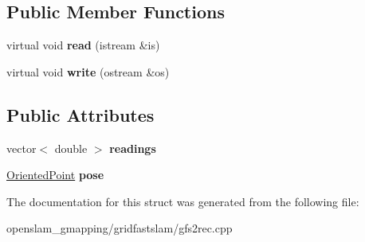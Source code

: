 \subsection*{Public Member Functions}
\begin{DoxyCompactItemize}
\item 
\mbox{\label{structLaserRecord_ab5b904cd01d1d4762af5dee413091611}} 
virtual void {\bfseries read} (istream \&is)
\item 
\mbox{\label{structLaserRecord_aae737a162d4637db561a1fc6191aa498}} 
virtual void {\bfseries write} (ostream \&os)
\end{DoxyCompactItemize}
\subsection*{Public Attributes}
\begin{DoxyCompactItemize}
\item 
\mbox{\label{structLaserRecord_ac6dfd785b656d6b191e8ffa6c0a20a7a}} 
vector$<$ double $>$ {\bfseries readings}
\item 
\mbox{\label{structLaserRecord_ac79d14de8f010aec320b50b95138ab1f}} 
\hyperlink{structGMapping_1_1orientedpoint}{Oriented\+Point} {\bfseries pose}
\end{DoxyCompactItemize}


The documentation for this struct was generated from the following file\+:\begin{DoxyCompactItemize}
\item 
openslam\+\_\+gmapping/gridfastslam/gfs2rec.\+cpp\end{DoxyCompactItemize}
